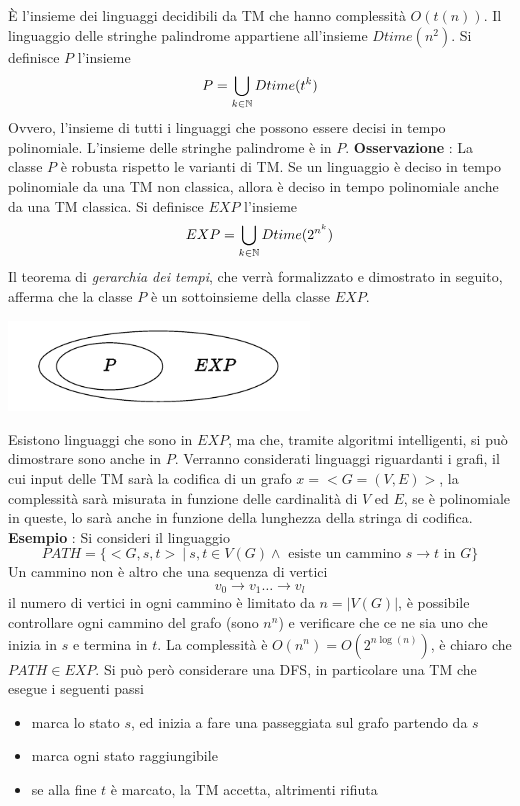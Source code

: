 \documentclass[10pt, letterpaper]{report}
\begin{document}
È l'insieme dei linguaggi decidibili da TM che hanno complessità $O(t(n))$. Il linguaggio delle stringhe palindrome appartiene all'insieme $Dtime(n^2)$.\acc 
{} Si definisce $P$ l'insieme 
$$ P=\bigcup_{k\in {\mathbb N}}Dtime(t^k)$$
Ovvero, l'insieme di tutti i linguaggi che possono essere decisi in tempo polinomiale. L'insieme delle stringhe palindrome è in $P$. \acc 
\textbf{Osservazione} : La classe $P$ è robusta rispetto le varianti di TM. Se un linguaggio è deciso in tempo polinomiale da una TM non classica, allora è deciso in tempo polinomiale anche da una TM classica.\acc 
{} Si definisce $EXP$ l'insieme 
$$ EXP=\bigcup_{k\in {\mathbb N}}Dtime(2^{n^k})$$
Il teorema di \textit{gerarchia dei tempi}, che verrà formalizzato e dimostrato in seguito, afferma che la classe $P$ è un sottoinsieme della classe $EXP$.\begin{center}
    \includegraphics[width=0.6\textwidth ]{images/EXP.pdf}
\end{center}
Esistono linguaggi che sono in $EXP$, ma che, tramite algoritmi intelligenti, si può dimostrare sono anche in $P$. Verranno considerati linguaggi riguardanti i grafi, il cui input delle TM sarà la codifica di un grafo $x=<G=(V,E)>$, la complessità sarà misurata in funzione delle cardinalità di $V$ ed $E$, se è polinomiale in queste, lo sarà anche in funzione della lunghezza della stringa di codifica.\acc 
\textbf{Esempio} : Si consideri il linguaggio 
$$ PATH = \{<G,s,t> \ | \ s,t\in V(G) \land \text{ esiste un cammino }s\rightarrow t\text{ in }G\}$$
Un cammino non è altro che una sequenza di vertici $$v_0\rightarrow v_1 \dots \rightarrow v_l$$ il numero di vertici in ogni cammino è limitato da $n=|V(G)|$, è possibile controllare ogni cammino  del grafo (sono $n^n$) e verificare che ce ne sia uno che inizia in $s$ e termina in $t$. La complessità è $O(n^n)=O(2^{n\log(n)})$, è chiaro che $PATH\in EXP$.\acc 
Si può però considerare una DFS, in particolare una TM che esegue i seguenti passi\begin{itemize}
    \item marca lo stato $s$, ed inizia a fare una passeggiata sul grafo partendo da $s$
    \item marca ogni stato raggiungibile 
    \item se alla fine $t$ è marcato, la TM accetta, altrimenti rifiuta\hfill 
\end{itemize}
\end{document}

